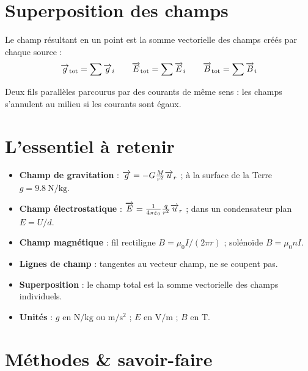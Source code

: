 \section{Superposition des champs}

\begin{propriete}
Le champ résultant en un point est la somme vectorielle des champs créés par chaque source :
\[
\overrightarrow{g}_{\text{tot}} = \sum \overrightarrow{g}_i \qquad \overrightarrow{E}_{\text{tot}} = \sum \overrightarrow{E}_i \qquad \overrightarrow{B}_{\text{tot}} = \sum \overrightarrow{B}_i
\]
\end{propriete}

\begin{exemple}
Deux fils parallèles parcourus par des courants de même sens : les champs s’annulent au milieu si les courants sont égaux.
\end{exemple}

\section{L’essentiel à retenir}

\begin{synthese}
\begin{itemize}
\item \textbf{Champ de gravitation} : $\overrightarrow{g} = -G\frac{M}{r^2}\overrightarrow{u}_r$ ; à la surface de la Terre $g = \SI{9.8}{\newton\per\kilogram}$.
\item \textbf{Champ électrostatique} : $\overrightarrow{E} = \frac{1}{4\pi\varepsilon_0}\frac{q}{r^2}\overrightarrow{u}_r$ ; dans un condensateur plan $E = U/d$.
\item \textbf{Champ magnétique} : fil rectiligne $B = \mu_0 I/(2\pi r)$ ; solénoïde $B = \mu_0 n I$.
\item \textbf{Lignes de champ} : tangentes au vecteur champ, ne se coupent pas.
\item \textbf{Superposition} : le champ total est la somme vectorielle des champs individuels.
\item \textbf{Unités} : $g$ en $\si{\newton\per\kilogram}$ ou $\si{\metre\per\second\squared}$ ; $E$ en $\si{\volt\per\metre}$ ; $B$ en $\si{\tesla}$.
\end{itemize}
\end{synthese}

\section{Méthodes \& savoir-faire}

